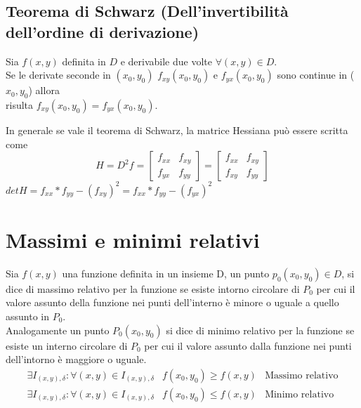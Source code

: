 \subsection{Teorema di Schwarz (Dell'invertibilità dell'ordine di derivazione)\label{Schwarz}}
\begin{teorema}
  Sia $f(x,y)$ definita in $D$ e derivabile due volte $\forall (x,y) \in D$.\\
  Se le derivate seconde in $(x_0,y_0)$ $f_{xy}(x_0,y_0)$ e $f_{yx}(x_0,y_0)$ sono continue in ($x_0,y_0$) allora\\
  risulta $f_{xy}(x_0,y_0)=f_{yx}(x_0,y_0)$.
\end{teorema}
In generale se vale il teorema di Schwarz, la matrice Hessiana può essere scritta come
\begin{equation*}
  H=D^2f=\begin{bmatrix}
           f_{xx} & f_{xy}\\
           f_{yx} & f_{yy}
         \end{bmatrix}
         = \begin{bmatrix}
             f_{xx} & f_{xy}\\
             f_{xy} & f_{yy}
           \end{bmatrix}
\end{equation*}
$det H= f_{xx}*f_{yy}-(f_{xy})^2=f_{xx}*f_{yy}-(f_{yx})^2$
\section{Massimi e minimi relativi \label{minmaxrel}}
\begin{defi}
  Sia $f(x,y)$ una funzione definita in un insieme D, un punto $p_0(x_0,y_0)\in D$, si dice di {\color{red}
    massimo relativo} per la funzione se esiste intorno circolare di $P_0$ per cui il valore assunto della
  funzione nei punti dell'interno è minore o uguale a quello assunto in $P_0$.\\
  Analogamente un punto $P_0(x_0,y_0)$ si dice di {\color{red} minimo relativo} per la funzione se esiste un
  interno circolare di $P_0$ per cui il valore assunto dalla funzione nei punti dell'intorno è maggiore o uguale.
  \begin{equation*}
    \begin{matrix}
      \exists I_{(x,y),\delta}:\forall (x,y)\in I_{(x,y),\delta} & f(x_0,y_0)\geq f(x,y) & \text{Massimo relativo}\\
      \exists I_{(x,y),\delta}:\forall (x,y)\in I_{(x,y),\delta} & f(x_0,y_0)\leq f(x,y) & \text{Minimo relativo}
    \end{matrix}
  \end{equation*} 
\end{defi}
